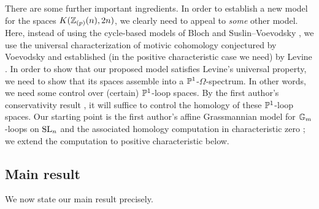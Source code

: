 \documentclass{amsart}
\numberwithin{proposition}{section}
\numberwithin{equation}{section}
\begin{document}
There are some further important ingredients.
In order to establish a new model for the spaces $K(\Z_{(p)}(n), 2n)$, we clearly need to appeal to \emph{some} other model.
Here, instead of using the cycle-based models of Bloch \cite{bloch1986algebraic} and Suslin--Voevodsky \cite[Definition~3.1]{suslin2000bloch}, we use the universal characterization of motivic cohomology conjectured by Voevodsky \cite[Conjecture~10]{voevodsky-slice-filtration} and established (in the positive characteristic case we need) by Levine \cite[Theorem~10.5.1]{levine2008homotopy}.
In order to show that our proposed model satisfies Levine's universal property, we need to show that its spaces assemble into a $\P^1$-$\Omega$-spectrum.
In other words, we need some control over (certain) $\P^1$-loop spaces.
By the first author's conservativity result \cite[Corollary~4.15]{bachmann-moving2}, it will suffice to control the homology of these $\P^1$-loop spaces.
Our starting point is the first author's affine Grassmannian model for $\Gm$-loops on $\SL_n$ and the associated homology computation in characteristic zero \cite[Theorem~20 and Corollary~25]{bachmann-grassmann}; we extend the computation to positive characteristic below.

\subsection{Main result} \label{subsec:intro-main}
We now state our main result precisely.
\end{document}
